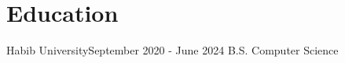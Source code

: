 \section{Education}
  \resumeSubHeadingListStart
    \resumeSubheading
      {Habib University}{September 2020 - June 2024}
      {B.S. Computer Science}{}
      \resumeSubHeadingListEnd